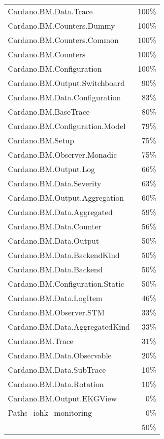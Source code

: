 \begin{tabular}{l r}
   Cardano.BM.Data.Trace & 100\% \\
   Cardano.BM.Counters.Dummy & 100\% \\
   Cardano.BM.Counters.Common & 100\% \\
   Cardano.BM.Counters & 100\% \\
   Cardano.BM.Configuration & 100\% \\
   Cardano.BM.Output.Switchboard & 90\% \\
   Cardano.BM.Data.Configuration & 83\% \\
   Cardano.BM.BaseTrace & 80\% \\
   Cardano.BM.Configuration.Model & 79\% \\
   Cardano.BM.Setup & 75\% \\
   Cardano.BM.Observer.Monadic & 75\% \\
   Cardano.BM.Output.Log & 66\% \\
   Cardano.BM.Data.Severity & 63\% \\
   Cardano.BM.Output.Aggregation & 60\% \\
   Cardano.BM.Data.Aggregated & 59\% \\
   Cardano.BM.Data.Counter & 56\% \\
   Cardano.BM.Data.Output & 50\% \\
   Cardano.BM.Data.BackendKind & 50\% \\
   Cardano.BM.Data.Backend & 50\% \\
   Cardano.BM.Configuration.Static & 50\% \\
   Cardano.BM.Data.LogItem & 46\% \\
   Cardano.BM.Observer.STM & 33\% \\
   Cardano.BM.Data.AggregatedKind & 33\% \\
   Cardano.BM.Trace & 31\% \\
   Cardano.BM.Data.Observable & 20\% \\
   Cardano.BM.Data.SubTrace & 10\% \\
   Cardano.BM.Data.Rotation & 10\% \\
   Cardano.BM.Output.EKGView & 0\% \\
   Paths\_iohk\_monitoring & 0\% \\
    & 50\% \\
\end{tabular}
